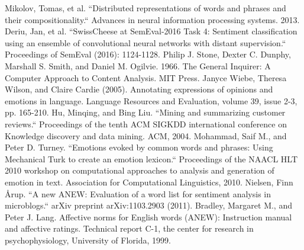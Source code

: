 \begin{thebibliography}{200}
 Mikolov, Tomas, et al. ``Distributed representations of words and phrases and their compositionality.`` Advances in neural information processing systems. 2013.\label{appendix:5.20}
 Deriu, Jan, et al. ``SwissCheese at SemEval-2016 Task 4: Sentiment classification using an ensemble of convolutional neural networks with distant supervision.`` Proceedings of SemEval (2016): 1124-1128.\label{appendix:5.21}
 Philip J. Stone, Dexter C. Dunphy, Marshall S. Smith, and Daniel M. Ogilvie. 1966. The General Inquirer: A Computer Approach to Content Analysis. MIT Press.\label{appendix:5.22}
 Janyce Wiebe, Theresa Wilson, and Claire Cardie (2005). Annotating expressions of opinions and emotions in language. Language Resources and Evaluation, volume 39, issue 2-3, pp. 165-210.\label{appendix:5.23}
 Hu, Minqing, and Bing Liu. ``Mining and summarizing customer reviews.`` Proceedings of the tenth ACM SIGKDD international conference on Knowledge discovery and data mining. ACM, 2004.\label{appendix:5.24}
 Mohammad, Saif M., and Peter D. Turney. ``Emotions evoked by common words and phrases: Using Mechanical Turk to create an emotion lexicon.`` Proceedings of the NAACL HLT 2010 workshop on computational approaches to analysis and generation of emotion in text. Association for Computational Linguistics, 2010.\label{appendix:5.25}
 Nielsen, Finn Årup. ``A new ANEW: Evaluation of a word list for sentiment analysis in microblogs.`` arXiv preprint arXiv:1103.2903 (2011).\label{appendix:5.26}
 Bradley, Margaret M., and Peter J. Lang. Affective norms for English words (ANEW): Instruction manual and affective ratings. Technical report C-1, the center for research in psychophysiology, University of Florida, 1999.\label{appendix:5.27}
\fi


\end{thebibliography}

